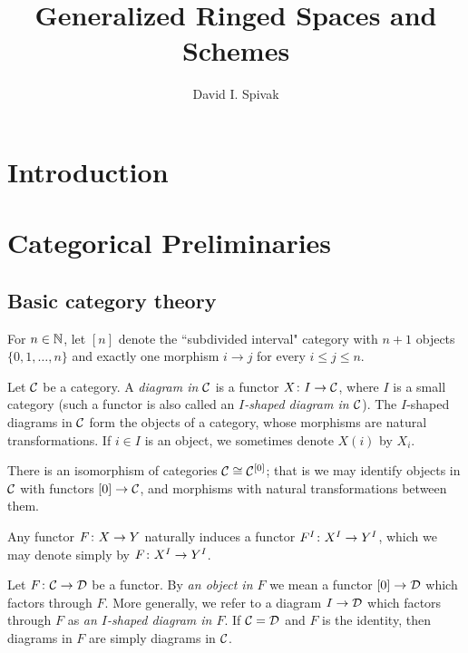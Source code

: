 \documentclass[10pt]{amsart}
\begin{document}
\title{Generalized Ringed Spaces and Schemes}

\author{David I. Spivak}

\maketitle

\note{\today}

\setcounter{tocdepth}{2}

\tableofcontents

\section{Introduction}

\section{Categorical Preliminaries}

\subsection{Basic category theory}

For $n\in{\mathbb N}$, let $[n]$ denote the ``subdivided interval" category with $n+1$ objects $\{0,1,\ldots,n\}$ and exactly one morphism
$i\to j$ for every $i\leq j\leq n$.

Let $\mathcal{C}$ be a category.  A {\em diagram in $\mathcal{C}$} is a functor $X\colon I\rightarrow\mathcal{C}$, where $I$ is a small category (such a functor is
also called an {\em $I$-shaped diagram in $\mathcal{C}$}).  The $I$-shaped diagrams in $\mathcal{C}$ form the objects of a category, whose
morphisms are natural transformations.  If $i\in I$ is an object, we sometimes denote $X(i)$ by $X_i$.

There is an isomorphism of categories $\mathcal{C}\cong\mathcal{C}^{[0]}$; that is we may identify objects in $\mathcal{C}$ with functors $[0]\rightarrow\mathcal{C}$,
and morphisms with natural transformations between them.

Any functor $F\colon X\rightarrow Y$ naturally induces a functor $F^I\colon X^I\rightarrow Y^I$, which we may denote simply by $F\colon X^I\rightarrow Y^I$.

Let $F\colon \mathcal{C}\rightarrow\mathcal{D}$ be a functor.  By {\em an object in $F$} we mean a functor $[0]\rightarrow\mathcal{D}$ which factors through $F$.  More
generally, we refer to a diagram $I\rightarrow\mathcal{D}$ which factors through $F$ as {\em an $I$-shaped diagram in $F$}.  If $\mathcal{C}=\mathcal{D}$ and
$F$ is the identity, then diagrams in $F$ are simply diagrams in $\mathcal{C}$.
\end{document}
